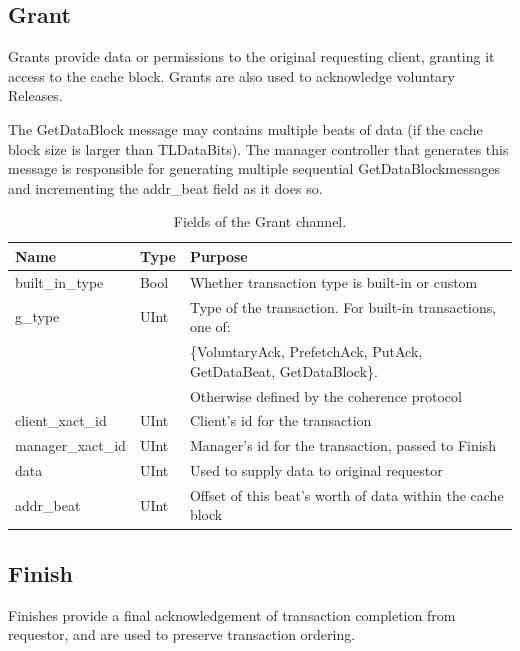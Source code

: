 \subsection{Grant}

Grants provide data or permissions to the original requesting client, granting it access to the cache block.
Grants are also used to acknowledge voluntary Releases.

The GetDataBlock message may contains multiple beats of data (if the cache block size is larger than TLDataBits).
The manager controller that generates this message is responsible for generating multiple sequential GetDataBlockmessages and incrementing the addr\_beat field as it does so.

\begin{table}[ht]
\begin{center}
\begin{tabular}{|l|l|l|}
    \hline
    Name & Type & Purpose \\ \hline \hline
built\_in\_type & Bool & Whether transaction type is built-in or custom \\ \hline
g\_type & UInt & Type of the transaction. For built-in transactions, one of: \\
        &      & \{VoluntaryAck, PrefetchAck, PutAck, GetDataBeat, GetDataBlock\}. \\
        &      & Otherwise defined by the coherence protocol \\ \hline
client\_xact\_id & UInt & Client's id for the transaction \\ \hline
manager\_xact\_id & UInt & Manager's id for the transaction, passed to Finish \\ \hline
data & UInt & Used to supply data to original requestor \\ \hline
addr\_beat & UInt & Offset of this beat's worth of data within the cache block \\ \hline
\end{tabular}
\end{center}
\caption{Fields of the Grant channel.}
\label{tab:grant}
\end{table}


\subsection{Finish}

Finishes provide a final acknowledgement of transaction completion from requestor, and are used to preserve transaction ordering.

